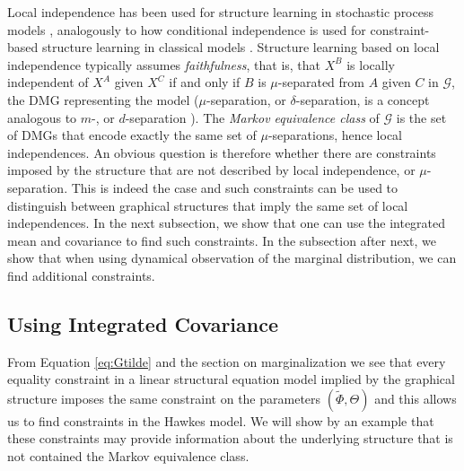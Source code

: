 \documentclass[accepted]{uai2021} %
\begin{document}
Local independence has been used for structure learning in stochastic process 
models 
\citep{meek2014, mogensenUAI2018, thams2019, mogensenUAI2020}, analogously to 
how conditional independence is used for 
constraint-based structure learning in classical models \citep{spirtes1993, 
spirtesSearchChapHandbook}. Structure learning based on local independence 
typically assumes 
\emph{faithfulness}, that is, that $X^B$ is locally independent of $X^A$ given 
$X^C$ if and only if $B$ is $\mu$-separated from $A$ given $C$ in 
$\mathcal{G}$, the DMG 
representing the model
($\mu$-separation, or $\delta$-separation, is a concept analogous to $m$-, or 
$d$-separation \citep{didelez2000, didelez2008, mogensen2018}). The 
\emph{Markov equivalence class} of $\mathcal{G}$ is the set of DMGs that encode 
exactly the same set of $\mu$-separations, 
hence local independences. An obvious 
question is therefore whether there are constraints imposed by the 
 structure that are not described by local independence, or $\mu$-separation. 
 This is indeed the 
 case 
 and such constraints can be used to distinguish between graphical structures 
 that imply the same set of local independences. In the next subsection, we 
 show that one can use the integrated mean and covariance to find such 
 constraints. In the subsection after next, we show that when using
 dynamical observation of the marginal distribution, we can find additional 
 constraints.


\subsection{Using Integrated Covariance}

From Equation \ref{eq:Gtilde} and the section on marginalization we see that 
every equality 
constraint in a linear structural equation model implied by the graphical 
structure imposes the same constraint
on the parameters $(\tilde{\Phi}, \Theta)$ and this allows us to find 
constraints 
in the Hawkes model. We will show by an example that these constraints may 
provide information about the underlying structure that is not contained the 
Markov equivalence class.
\end{document}

